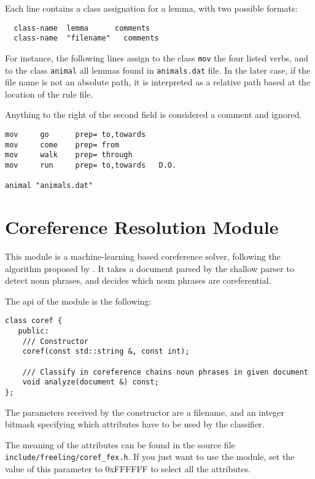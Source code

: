 \documentclass[a4paper]{book}
\begin{document}
   Each line contains a class assignation for a lemma, with two possible formats:
\begin{verbatim}
  class-name  lemma      comments
  class-name  "filename"   comments
\end{verbatim}

   For instance, the following lines assign to the class \verb#mov#
   the four listed verbs, and to the class \verb#animal# all lemmas
   found in \verb#animals.dat# file.  In the later case, if the file
   name is not an absolute path, it is interpreted as a relative path
   based at the location of the rule file.

    Anything to the right of the second field is considered a comment and ignored.
\begin{verbatim}
mov     go      prep= to,towards
mov     come    prep= from
mov     walk    prep= through
mov     run     prep= to,towards   D.O.

animal "animals.dat"
\end{verbatim}



\section{Coreference Resolution Module}
\label{mod-coref}

  This module is a machine-learning based coreference solver,
  following the algorithm proposed by \cite{soon01}.  It takes a
  document parsed by the shallow parser to detect noun phrases, and
  decides which noun phrases are coreferential.

  The api of the module is the following:
\begin{verbatim}
class coref {
   public:
    /// Constructor
    coref(const std::string &, const int);

    /// Classify in coreference chains noun phrases in given document
    void analyze(document &) const;
};
\end{verbatim}

  The parameters received by the constructor are a filename, and an
  integer bitmask specifying which attributes have to be used by the
  classifier.

  The meaning of the attributes can be found in the source file {\tt include/freeling/coref\_fex.h}. If you just want to use the module, set the value of this parameter to 0xFFFFFF to select all the attributes.
\end{document}
